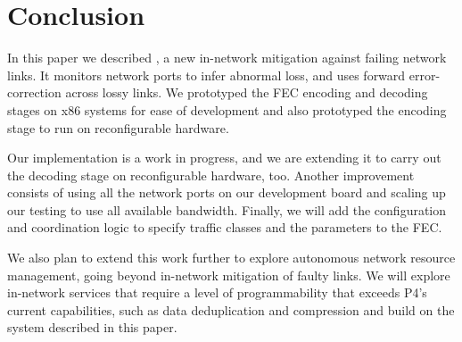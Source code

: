 \section{Conclusion}
In this paper we described \OurSys, a new in-network mitigation
against failing network links. It monitors network ports to infer
abnormal loss, and uses forward error-correction across lossy links.
We prototyped the FEC
encoding and decoding stages on x86 systems for ease of development
and also prototyped the encoding stage to run on reconfigurable
hardware.

Our implementation is a work in progress, and we are extending it to
carry out the decoding stage on reconfigurable hardware, too.
Another improvement consists of using all the network ports on our
development board and scaling up our testing to use all available
bandwidth.
Finally, we will add the configuration and coordination logic to
specify traffic classes and the parameters to the FEC.

We also plan to extend this work further to explore autonomous
network resource management, going beyond in-network mitigation of
faulty links. We will explore in-network services that require
a level of programmability that exceeds P4's current capabilities,
such as data deduplication and compression and build on the system
described in this paper.
